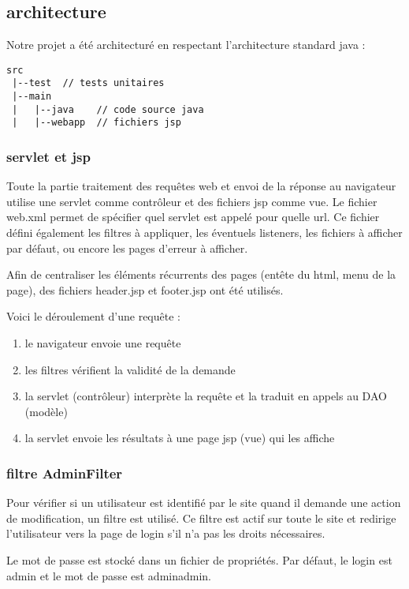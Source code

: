 \subsection{architecture}

Notre projet a été architecturé en respectant l'architecture standard java :
\begin{verbatim}
src
 |--test  // tests unitaires
 |--main
 |   |--java    // code source java
 |   |--webapp  // fichiers jsp
\end{verbatim}

\subsubsection{servlet et jsp}
Toute la partie traitement des requêtes web et envoi de la réponse au navigateur utilise une servlet comme contrôleur et des fichiers jsp comme vue. Le fichier web.xml permet de spécifier quel servlet est appelé pour quelle url. Ce fichier défini également les filtres à appliquer, les éventuels listeners, les fichiers à afficher par défaut, ou encore les pages d'erreur à afficher.

Afin de centraliser les éléments récurrents des pages (entête du html, menu de la page), des fichiers header.jsp et footer.jsp ont été utilisés.

Voici le déroulement d'une requête : 
\begin{enumerate}
	\item le navigateur envoie une requête
	\item les filtres vérifient la validité de la demande
	\item la servlet (contrôleur) interprète la requête et la traduit en appels au DAO (modèle)
	\item la servlet envoie les résultats à une page jsp (vue) qui les affiche
\end{enumerate}

\subsubsection{filtre AdminFilter}
Pour vérifier si un utilisateur est identifié par le site quand il demande une action de modification, un filtre est utilisé. Ce filtre est actif sur toute le site et redirige l'utilisateur vers la page de login s'il n'a pas les droits nécessaires.

Le mot de passe est stocké dans un fichier de propriétés. Par défaut, le login est admin et le mot de passe est adminadmin.

